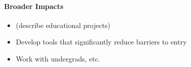 \paragraph*{Broader Impacts}
\begin{itemize}
\item (describe educational projects)
\item Develop tools that significantly reduce barriers to entry
\item Work with undergrads, etc.
\end{itemize}

